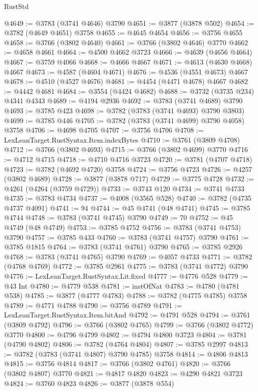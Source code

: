 \begin{lexlean}{RustStd}
\begin{coremodule}
@4649 := @3783 (@3741 @4646) @3790
@4651 := @3877 (@3878 @502)
@4654 := @3782 (@4649 @4651) @3758
@4655 := @4645 @4654
@4656 := @3756 @4655
@4658 := @3766 (@3802 @4640)
@4661 := @3766 (@3802 @4646) @3770
@4662 := @4658 @4661
@4664 := @4500 @4662 @3723
@4666 := @4639 (@4656 @4664)
@4667 := @3759 @4066
@4668 := @4666 @4667
@4671 := @4613 (@4630 @4668) @4667
@4673 := @4587 (@4604 @4671)
@4676 := @4536 (@4551 @4673) @4667
@4678 := @4510 (@4527 @4676)
@4681 := @4454 (@4471 @4678) @4667
@4682 := @4442 @4681
@4684 := @3554 (@4424 @4682)
@4688 := @3732 (@3735 @234) @4341 @4343
@4689 := @4194 @2936
@4692 := @3783 (@3741 @4689) @3790
@4693 := @3785 @423
@4698 := @3782 (@3783 (@3741 @4693) @3790 @3803)
@4699 := @3785 @446
@4705 := @3782 (@3783 (@3741 @4699) @3790 @4058) @3758
@4706 := @4698 @4705
@4707 := @3756 @4706
@4708 := LexLeanTarget.RustSyntax.Item.indexBytes
@4710 := @3761 (@3809 @4708)
@4712 := @3766 (@3802 @4693)
@4715 := @3766 (@3802 @4699) @3770
@4716 := @4712 @4715
@4718 := @4710 @4716 @3723
@4720 := @3781 (@4707 @4718)
@4723 := @3782 (@4692 @4720) @3758
@4724 := @3756 @4723
@4726 := @4257 (@3802 @4689)
@4728 := @3877 (@3878 @717)
@4729 := @3775 @4728
@4732 := @4261 (@4264 (@3759 @4729))
@4733 := @3743 @120
@4734 := @3741 @4733
@4735 := @3783 @4734
@4737 := @4008 (@3565 @528)
@4740 := @3782 (@4735 @4737 @4091)
@4741 := 94
@4744 := @45 @4741 (@48 @4741)
@4745 := @3785 @4744
@4748 := @3783 (@3741 @4745) @3790
@4749 := 70
@4752 := @45 @4749 (@48 @4749)
@4753 := @3785 @4752
@4756 := @3783 (@3741 @4753) @3790
@4757 := @3785 @433
@4760 := @3783 (@3741 @4757) @3790
@4761 := @3785 @1815
@4764 := @3783 (@3741 @4761) @3790
@4765 := @3785 @2926
@4768 := @3783 (@3741 @4765) @3790
@4769 := @4057 @4733
@4771 := @3782 (@4768 @4769)
@4772 := @3785 @2961
@4775 := @3783 (@3741 @4772) @3790
@4776 := LexLeanTarget.RustSyntax.Lit.fixed
@4777 := @4776 @528
@4779 := @43 Int
@4780 := @4779 @538
@4781 := instOfNat
@4783 := @4780 (@4781 @538)
@4785 := @3877 (@4777 @4783)
@4788 := @3782 (@4775 @4785) @3758
@4789 := @4771 @4788
@4790 := @3756 @4789
@4791 := LexLeanTarget.RustSyntax.Item.bitAnd
@4792 := @4791 @528
@4794 := @3761 (@3809 @4792)
@4796 := @3766 (@3802 @4765)
@4799 := @3766 (@3802 @4772) @3770
@4800 := @4796 @4799
@4802 := @4794 @4800 @3723
@4804 := @3781 (@4790 @4802)
@4806 := @3782 (@4764 @4804)
@4807 := @3785 @2997
@4813 := @3782 (@3783 (@3741 @4807) @3790 @4785) @3758
@4814 := @4806 @4813
@4815 := @3756 @4814
@4817 := @3766 (@3802 @4761)
@4820 := @3766 (@3802 @4807) @3770
@4821 := @4817 @4820
@4823 := @4290 @4821 @3723
@4824 := @3760 @4823
@4826 := @3877 (@3878 @554)

\end{coremodule}
\end{lexlean}
